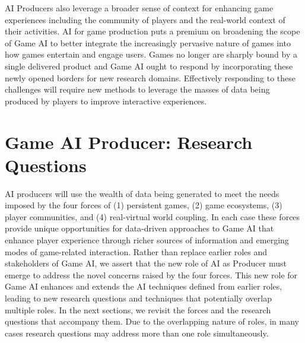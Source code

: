 \documentclass[conference]{IEEEtran}
\begin{document}
AI Producers also leverage a broader sense of context for enhancing game experiences including the community of players and the real-world context of their activities.
AI for game production puts a premium on broadening the scope of Game AI to better integrate the increasingly pervasive nature of games into how games entertain and engage users. 
Games no longer are sharply bound by a single delivered product and Game AI ought to respond by incorporating these newly opened borders for new research domains. 
Effectively responding to these challenges will require new methods to leverage the masses of data being produced by players to improve interactive experiences.



\section{Game AI Producer: Research Questions}

AI producers will use the wealth of data being generated to meet the needs imposed by the four forces of (1) persistent games, (2) game ecosystems, (3) player communities, and (4) real-virtual world coupling. 
In each case these forces provide unique opportunities for data-driven approaches to Game AI that enhance player experience through richer sources of information and emerging modes of game-related interaction. 
Rather than replace earlier roles and stakeholders of Game AI, we assert that the new role of AI as Producer must emerge to address the novel concerns raised by the four forces.
This new role for Game AI enhances and extends the AI techniques defined from earlier roles,
leading to new research questions and techniques that potentially overlap multiple roles.
%
In the next sections, we revisit the forces and the research questions that accompany them.
Due to the overlapping nature of roles, in many cases research questions may address more than one role simultaneously.
\end{document}
